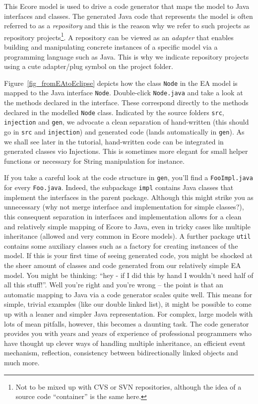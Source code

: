 This Ecore model is used to drive a code generator that maps the model to Java interfaces and classes.  
The generated Java code that represents the model is often referred to as a \emph{repository} and this is the reason why we refer to such projects as repository projects\footnote{Not to be mixed up with CVS or SVN repositories, although the idea of a source code ``container'' is the same here.}. 
A repository can be viewed as an \emph{adapter} that enables building and manipulating concrete instances of a specific model via a programming language such as Java.  
This is why we indicate repository projects using a cute adapter/plug symbol on the project folder.  

Figure~\ref{fig_fromEAtoEclipse} depicts how the class \texttt{Node} in the EA model is mapped to the Java interface \texttt{Node}.  
Double-click \texttt{Node.java} and take a look at the methods declared in the interface.
These correspond directly to the methods declared in the modelled \texttt{Node} class.  
Indicated by the source folders \texttt{src}, \texttt{injection} and \texttt{gen}, we advocate a clean separation of hand-written (this should go in \texttt{src} and \texttt{injection}) and generated code (lands automatically in \texttt{gen}).  
As we shall see later in the tutorial, hand-written code can be integrated in generated classes vio Injections. 
This is sometimes more elegant for small helper functions or necessary for String manipulation for instance.

If you take a careful look at the code structure in \texttt{gen}, you'll find a \texttt{Foo\-Impl.java} for every \texttt{Foo.java}. 
Indeed, the subpackage \texttt{impl} contains Java classes that implement the interfaces in the parent package.  
Although this might strike you as unnecessary (why not merge interface and implementation for simple classes?), this consequent separation in interfaces and implementation allows for a clean and relatively simple mapping of Ecore to Java, even in tricky cases like multiple inheritance (allowed and very common in Ecore models).  
A further package \texttt{util} contains some auxiliary classes such as a factory for creating instances of the model.  
If this is your first time of seeing generated code, you might be shocked at the sheer amount of classes and code generated from our relatively simple EA model.  
You might be thinking: ``hey - if I did this by hand I wouldn't need half of all this stuff!''.  
Well you're right and you're wrong -- the point is that an automatic mapping to Java via a code generator scales quite well.
This means for simple, trivial examples (like our double linked list), it might be possible to come up with a leaner and simpler Java representation.  
For complex, large models with lots of mean pitfalls, however, this becomes a daunting task.  
The code generator provides you with years and years of experience of professional programmers who have thought up clever ways of handling multiple inheritance, an efficient event mechanism, reflection, consistency between bidirectionally linked objects and much more.

